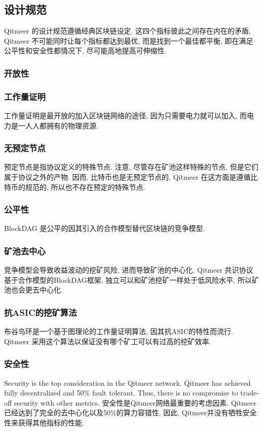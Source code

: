 \documentclass[a4paper,11pt]{article}
\begin{document}
\subsection{设计规范}
Qitmeer 的设计规范遵循经典区块链设定. 这四个指标彼此之间存在内在的矛盾, Qitmeer 不可能同时让每个指标都达到最优, 而是找到一个最佳都平衡, 即在满足公平性和安全性都情况下, 尽可能高地提高可伸缩性.

\subsubsection{开放性}

\subsubsection*{工作量证明}
工作量证明是最开放的加入区块链网络的途径, 因为只需要电力就可以加入, 而电力是一人人都拥有的物理资源. 
\subsubsection*{无预定节点}
预定节点是指协议定义的特殊节点. 注意, 尽管存在矿池这样特殊的节点, 但是它们属于协议之外的产物. 因而, 比特币也是无预定节点的, Qitmeer 在这方面是遵循比特币的规范的, 所以也不存在预定的特殊节点.
\subsubsection{公平性}
BlockDAG 是公平的因其引入的合作模型替代区块链的竞争模型.

\subsubsection*{矿池去中心}
竞争模型会导致收益波动的挖矿风险, 进而导致矿池的中心化. Qitmeer 共识协议基于合作模型的BlockDAG框架, 独立可以和矿池挖矿一样处于低风险水平, 所以矿池也会更去中心化.

\subsubsection*{抗ASIC的挖矿算法}
布谷鸟环是一个基于图理论的工作量证明算法, 因其抗ASIC的特性而流行. Qitmeer 采用这个算法以保证没有哪个矿工可以有过高的挖矿效率.
\subsubsection{安全性}
Security is the top consideration in the Qitmeer network. Qitmeer has achieved fully decentralized and 50\% fault tolerant. Thus, there is no compromise to trade-off security with other metrics.
安全性是Qitmeer网络最重要的考虑因素. Qitmeer已经达到了完全的去中心化以及50\%的算力容错性. 因此, Qitmeer并没有牺牲安全性来获得其他指标的性能.
\end{document}

